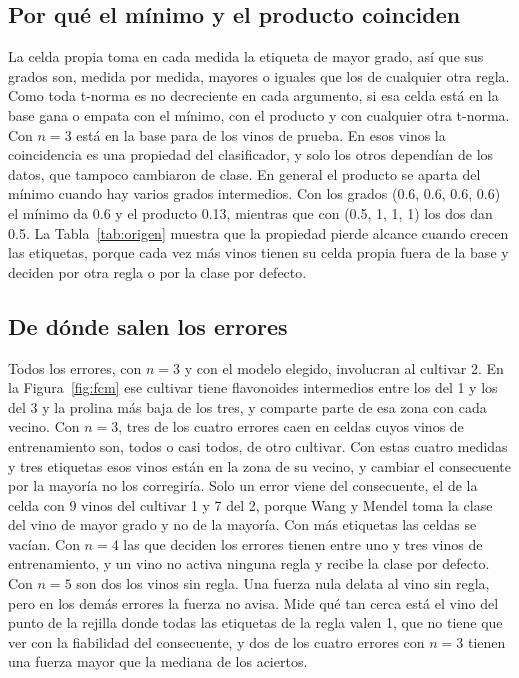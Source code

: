 \documentclass[11pt,letterpaper]{article}
\begin{document}
\subsection{Por qué el mínimo y el producto coinciden}

La celda propia toma en cada medida la etiqueta de mayor grado, así que sus grados son, medida por medida, mayores o iguales que los de cualquier otra regla. Como toda t-norma es no decreciente en cada argumento, si esa celda está en la base gana o empata con el mínimo, con el producto y con cualquier otra t-norma. Con $n=3$ está en la base para \propiaTres{} de los \nTe{} vinos de prueba. En esos vinos la coincidencia es una propiedad del clasificador, y solo los otros \otraTres{} dependían de los datos, que tampoco cambiaron de clase. En general el producto se aparta del mínimo cuando hay varios grados intermedios. Con los grados (0.6, 0.6, 0.6, 0.6) el mínimo da 0.6 y el producto 0.13, mientras que con (0.5, 1, 1, 1) los dos dan 0.5. La Tabla~\ref{tab:origen} muestra que la propiedad pierde alcance cuando crecen las etiquetas, porque cada vez más vinos tienen su celda propia fuera de la base y deciden por otra regla o por la clase por defecto.

\subsection{De dónde salen los errores}

Todos los errores, con $n=3$ y con el modelo elegido, involucran al cultivar 2. En la Figura~\ref{fig:fcm} ese cultivar tiene flavonoides intermedios entre los del 1 y los del 3 y la prolina más baja de los tres, y comparte parte de esa zona con cada vecino. Con $n=3$, tres de los cuatro errores caen en celdas cuyos vinos de entrenamiento son, todos o casi todos, de otro cultivar. Con estas cuatro medidas y tres etiquetas esos vinos están en la zona de su vecino, y cambiar el consecuente por la mayoría no los corregiría. Solo un error viene del consecuente, el de la celda con 9 vinos del cultivar 1 y 7 del 2, porque Wang y Mendel toma la clase del vino de mayor grado y no de la mayoría. Con más etiquetas las celdas se vacían. Con $n=4$ las que deciden los errores tienen entre uno y tres vinos de entrenamiento, y un vino no activa ninguna regla y recibe la clase por defecto. Con $n=5$ son dos los vinos sin regla. Una fuerza nula delata al vino sin regla, pero en los demás errores la fuerza no avisa. Mide qué tan cerca está el vino del punto de la rejilla donde todas las etiquetas de la regla valen 1, que no tiene que ver con la fiabilidad del consecuente, y dos de los cuatro errores con $n=3$ tienen una fuerza mayor que la mediana de los aciertos.
\end{document}

